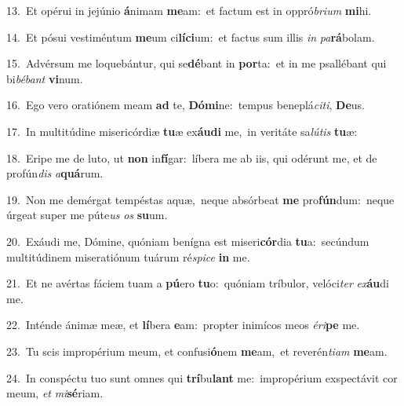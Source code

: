 {\numbfont\textcolor{\numbcolor}{13.}}~Et opérui in jejúnio \textbf{á}\-nimam \textbf{me}\-am:~\star et factum est in oppró\-\textit{bri}\-\textit{um} \textbf{mi}\-hi.\par
{\numbfont\textcolor{\numbcolor}{14.}}~Et pósui vestiméntum \textbf{me}\-um ci\-\textbf{lí}\-\textbf{ci}um:~\star et factus sum illis \textit{in} \textit{pa}\-\textbf{rá}bolam.\par
{\numbfont\textcolor{\numbcolor}{15.}}~Advérsum me loquebántur, qui se\-\textbf{dé}\-bant in \textbf{por}\-ta:~\star et in me psallébant qui bi\-\textit{bé}\-\textit{bant} \textbf{vi}\-num.\par
{\numbfont\textcolor{\numbcolor}{16.}}~Ego vero oratiónem meam \textbf{ad} te, \textbf{Dó}\-\textbf{mi}ne:~\star tempus beneplá\-\textit{ci}\-\textit{ti}, \textbf{De}\-us.\par
{\numbfont\textcolor{\numbcolor}{17.}}~In multitúdine misericórdiæ \textbf{tu}\-æ ex\-\textbf{áu}\-\textbf{di} me,~\star in veritáte sa\-\textit{lú}\-\textit{tis} \textbf{tu}\-æ:\par
{\numbfont\textcolor{\numbcolor}{18.}}~Eripe me de luto, ut \textbf{non} in\-\textbf{fí}\-gar:~\star líbera me ab iis, qui odérunt me, et de profún\textit{dis} \textit{a}\-\textbf{quá}rum.\par
{\numbfont\textcolor{\numbcolor}{19.}}~Non me demérgat tempéstas aquæ,~\dagger neque absórbeat \textbf{me} pro\-\textbf{fún}\-dum:~\star neque úrgeat super me púte\textit{us} \textit{os} \textbf{su}\-um.\par
{\numbfont\textcolor{\numbcolor}{20.}}~Exáudi me, Dómine, quóniam benígna est miseri\-\textbf{cór}\-dia \textbf{tu}\-a:~\star secúndum multitúdinem miseratiónum tuárum ré\-\textit{spi}\-\textit{ce} \textbf{in} me.\par
{\numbfont\textcolor{\numbcolor}{21.}}~Et ne avértas fáciem tuam a \textbf{pú}\-ero \textbf{tu}\-o:~\star quóniam tríbulor, velóci\textit{ter} \textit{ex}\-\textbf{áu}di me.\par
{\numbfont\textcolor{\numbcolor}{22.}}~Inténde ánimæ meæ, et \textbf{lí}\-bera \textbf{e}\-am:~\star propter inimícos meos \textit{é}\-\textit{ri}\textbf{pe} me.\par
{\numbfont\textcolor{\numbcolor}{23.}}~Tu scis impropérium meum, et confusi\-\textbf{ó}\-nem \textbf{me}\-am,~\star et reverén\-\textit{ti}\-\textit{am} \textbf{me}\-am.\par
{\numbfont\textcolor{\numbcolor}{24.}}~In conspéctu tuo sunt omnes qui \textbf{trí}\-bu\textbf{lant} me:~\star impropérium exspectávit cor meum, \textit{et} \textit{mi}\-\textbf{sé}riam.\par
